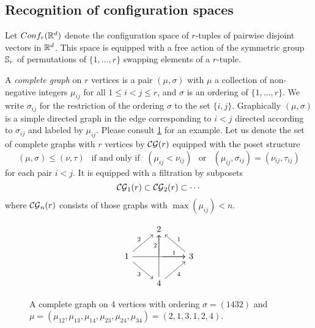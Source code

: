 
\subsection{Recognition of configuration spaces}\label{ss:recognition}

Let $Conf_{r}(\mathbb{R}^{d})$ denote the configuration space of $r$-tuples of pairwise disjoint vectors in $\mathbb{R}^{d}$.
This space is equipped with a free action of the symmetric group $\mathbb{S}_r$ of permutations of $\{1,\dots,r\}$ swapping elements of a $r$-tuple.

\begin{definition}
	A \textit{complete graph} on $r$ vertices is a pair $(\mu,\sigma)$ with $\mu$ a collection of non-negative integers $\mu_{ij}$ for all $1 \leq i < j \leq r$, and $\sigma$ is an ordering of $\{1,\dots,r\}$.
	We write $\sigma_{ij}$ for the restriction of the ordering $\sigma$ to the set $\{i,j\}$.
	Graphically $(\mu,\sigma)$ is a simple directed graph in the edge corresponding to $i<j$ directed according to $\sigma_{ij}$ and labeled by $\mu_{ij}$.
	Please consult \cref{f:complete graph} for an example.
	Let us denote the set of complete graphs with $r$ vertices by $\mathcal{CG}(r)$ equipped with the poset structure
	\begin{equation*}
		(\mu,\sigma)\le (\nu,\tau) \ \ \text{ if and only if } \ \
		(\mu_{ij}<\nu_{ij}) \ \ \text{ or } \ \
		(\mu_{ij},\sigma_{ij})= (\nu_{ij},\tau_{ij})
	\end{equation*}
	for each pair $i<j$.
	It is equipped with a filtration by subposets
	\[
	\mathcal{CG}_1(r) \subset \mathcal{CG}_2(r) \subset \dotsb
	\]
	where $\mathcal{CG}_n(r)$ consists of those graphs with $\max(\mu_{ij})< n$.
\end{definition}

\begin{figure}
	\centering
	\begin{equation*}
		\begin{tikzcd}
			\ & 2 & \ \\
			1 \arrow[ur,"2"] \arrow[rr] \arrow[dr,"3"']& \arrow[r,"1"] \arrow[u,"2"] & 3 \arrow[ul,"1"'] \\
			\ & 4 \arrow[ur,"4"'] \arrow[uu] & \
		\end{tikzcd}
	\end{equation*}
	\caption{A complete graph on 4 vertices with ordering $\sigma=(1432)$ and $\mu=(\mu_{12},\mu_{13},\mu_{14},\mu_{23},\mu_{24},\mu_{34})=(2,1,3,1,2,4)$.}
	\label{f:complete graph}
\end{figure}

